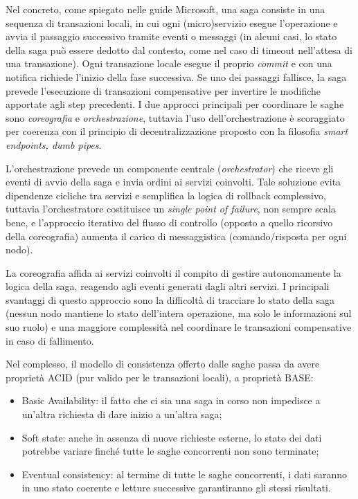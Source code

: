 Nel concreto, come spiegato nelle guide Microsoft\cite{Microsoft_Saga_Pattern}, una saga consiste in una sequenza di transazioni locali, in cui ogni (micro)servizio esegue l’operazione e avvia il passaggio successivo tramite eventi o messaggi (in alcuni casi, lo stato della saga può essere dedotto dal contesto, come nel caso di timeout nell'attesa di una transazione). Ogni transazione locale esegue il proprio \emph{commit} e con una notifica richiede l'inizio della fase successiva. Se uno dei passaggi fallisce, la saga prevede l'esecuzione di transazioni compensative per invertire le modifiche apportate agli step precedenti.
I due approcci principali per coordinare le saghe sono \emph{coreografia} e \emph{orchestrazione}, tuttavia l'uso dell'orchestrazione è scoraggiato per coerenza con il principio di decentralizzazione proposto con la filosofia \emph{smart endpoints, dumb pipes}.

L'orchestrazione prevede un componente centrale (\emph{orchestrator}) che riceve gli eventi di avvio della saga e invia ordini ai servizi coinvolti. Tale soluzione evita dipendenze cicliche tra servizi e semplifica la logica di rollback complessivo, tuttavia l'orchestratore costituisce un \emph{single point of failure}, non sempre scala bene, e l'approccio iterativo del flusso di controllo (opposto a quello ricorsivo della coreografia) aumenta il carico di messaggistica (comando/risposta per ogni nodo).

La coreografia affida ai servizi coinvolti il compito di gestire autonomamente la logica della saga, reagendo agli eventi generati dagli altri servizi. I principali svantaggi di questo approccio sono la difficoltà di tracciare lo stato della saga (nessun nodo mantiene lo stato dell'intera operazione, ma solo le informazioni sul suo ruolo) e una maggiore complessità nel coordinare le transazioni compensative in caso di fallimento.

Nel complesso, il modello di consistenza offerto dalle saghe passa da avere proprietà ACID (pur valido per le transazioni locali), a proprietà BASE:
\begin{itemize}
    \item Basic Availability: il fatto che ci sia una saga in corso non impedisce a un'altra richiesta di dare inizio a un'altra saga;
    \item Soft state: anche in assenza di nuove richieste esterne, lo stato dei dati potrebbe variare finché tutte le saghe concorrenti non sono terminate;
    \item Eventual consistency: al termine di tutte le saghe concorrenti, i dati saranno in uno stato coerente e letture successive garantiranno gli stessi risultati.
\end{itemize}

